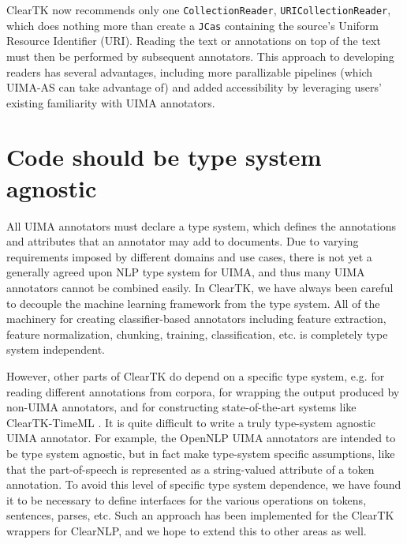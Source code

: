 \documentclass[10pt, a4paper]{article}
\newcommand{\code}[1]{\texttt{\small #1}}
\begin{document}
ClearTK now recommends only one \code{CollectionReader}, \code{URICollectionReader}, which does nothing more than create a \code{JCas} containing the source's Uniform Resource Identifier (URI).
Reading the text or annotations on top of the text must then be performed by subsequent annotators.
This approach to developing readers has several advantages, including more parallizable pipelines (which UIMA-AS can take advantage of) and added accessibility by leveraging users' existing familiarity with UIMA annotators.


\section{Code should be type system agnostic}
All UIMA annotators must declare a type system, which defines the annotations and attributes that an annotator may add to documents.
Due to varying requirements imposed by different domains and use cases, there is not yet a generally agreed upon NLP type system for UIMA, and thus many UIMA annotators cannot be combined easily.
In ClearTK, we have always been careful to decouple the machine learning framework from the type system. All of the machinery for creating classifier-based annotators including feature extraction, feature normalization, chunking, training, classification, etc. is completely type system independent.


However, other parts of ClearTK do depend on a specific type system, e.g. for reading different annotations from corpora, for wrapping the output produced by non-UIMA annotators, and for constructing state-of-the-art systems like ClearTK-TimeML \cite{bethard:2013:SemEval-2013}.
It is quite difficult to write a truly type-system agnostic UIMA annotator.
For example, the OpenNLP UIMA annotators are intended to be type system agnostic, but in fact make type-system specific assumptions, like that the part-of-speech is represented as a string-valued attribute of a token annotation.
To avoid this level of specific type system dependence, we have found it to be necessary to define interfaces for the various operations on tokens, sentences, parses, etc.
Such an approach has been implemented for the ClearTK wrappers for ClearNLP, and we hope to extend this to other areas as well.
\end{document}
